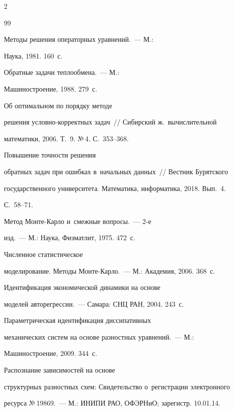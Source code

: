 \begin{multicols}{2}
{{\begin{thebibliography}{99}

     Методы решения операторных уравнений.~--- М.: 

Наука, 1981. 160~с.


     Обратные задачи теплообмена.~--- М.: 

Машиностроение, 1988. 279~с.


     Об оптимальном по порядку методе 

решения условно-корректных задач~// Сибирский ж.~вычислительной 

математики, 2006. Т.~9. №\,4. С.~353--368.


     Повышение точ\-ности решения 

обратных задач при ошибках в~начальных данных~// Вестник Бурятского 

государственного университета. Математика, информатика, 2018. Вып.~4. 

С.~58--71. 

   


     Метод Мон\-те-Кар\-ло и~смежные вопросы.~--- 2-е 

изд.~--- М.: Наука, Физматлит, 1975. 472~с. 




     Численное статистическое 

моделирование. Методы Мон\-те-Кар\-ло.~--- М.: Академия, 2006. 368~с.




     Идентификация экономической динамики на основе 

моделей авторегрессии.~--- Самара: СНЦ РАН, 2004. 243~с.


     Параметрическая идентификация диссипативных 

механических систем на основе разностных уравнений.~--- М.: 

Машиностроение, 2009. 344~с.


     Распознание зависимостей на основе 

структурных разностных схем: Свидетельство о~регистрации электронного 

ресурса №\,19869.~--- М.: ИНИПИ РАО, ОФЭРНиО; зарегистр. 10.01.14.

 \end{thebibliography}



 }

 }



\end{multicols}
